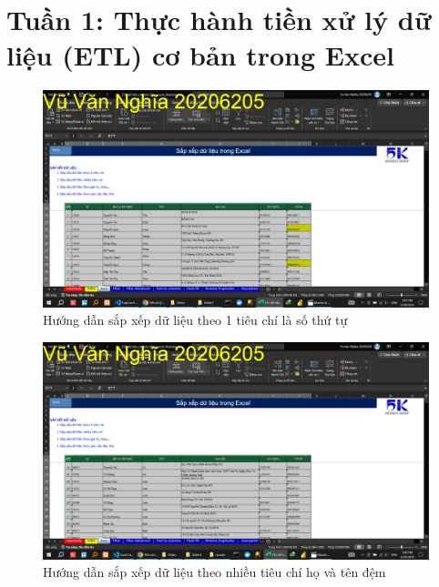 \documentclass{article}
\begin{document}
\listoffigures
\newpage
\section{Tuần 1: Thực hành tiền xử lý dữ liệu (ETL) cơ bản trong Excel}
\begin{figure}[h]
    \centering
    \includegraphics[scale = 0.15]{Video1/HuongDan/1.png}
    \caption{Hướng dẫn sắp xếp dữ liệu theo 1 tiêu chí là số thứ tự}
\end{figure}
\begin{figure}[h]
    \centering
    \includegraphics[scale = 0.15]{Video1/HuongDan/2.png}
    \caption{Hướng dẫn sắp xếp dữ liệu theo nhiều tiêu chí họ và tên đệm}
\end{figure}
\end{document}
